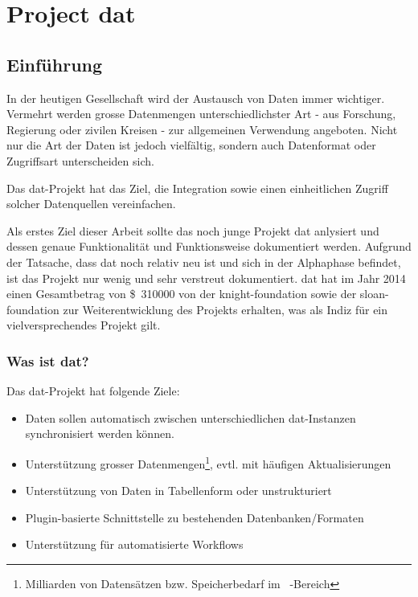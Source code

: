\part{Project dat}

\chapter{Einführung}

In der heutigen Gesellschaft wird der Austausch von Daten immer wichtiger. Vermehrt werden grosse Datenmengen unterschiedlichster Art - aus Forschung, Regierung oder zivilen Kreisen - zur allgemeinen Verwendung angeboten. Nicht nur die Art der Daten ist jedoch vielfältig, sondern auch Datenformat oder Zugriffsart unterscheiden sich.

Das \gls{dat}-Projekt hat das Ziel, die Integration sowie einen einheitlichen Zugriff solcher Datenquellen vereinfachen.

Als erstes Ziel dieser Arbeit sollte das noch junge Projekt \gls{dat} anlysiert und dessen genaue Funktionalität und Funktionsweise dokumentiert werden. Aufgrund der Tatsache, dass \gls{dat} noch relativ neu ist und sich in der Alphaphase befindet, ist das Projekt nur wenig und sehr verstreut dokumentiert. \Gls{dat} hat im Jahr 2014 einen Gesamtbetrag von \SI{310000}[\$]{} von der \gls{knight-foundation} sowie der \gls{sloan-foundation} zur Weiterentwicklung des Projekts erhalten, was als Indiz für ein vielversprechendes Projekt gilt.

\section{Was ist dat?} %

Das dat-Projekt hat folgende Ziele\cite{what-is-dat}: 

\begin{itemize}
\item Daten sollen automatisch zwischen unterschiedlichen dat-Instanzen synchronisiert werden können. 
\item Unterstützung grosser Datenmengen\footnote{Milliarden von Datensätzen bzw. Speicherbedarf im \si{\tera\byte}-Bereich}, evtl. mit häufigen Aktualisierungen
\item Unterstützung von Daten in Tabellenform oder unstrukturiert
\item Plugin-basierte Schnittstelle zu bestehenden Datenbanken/Formaten
\item Unterstützung für automatisierte Workflows
\end{itemize}

